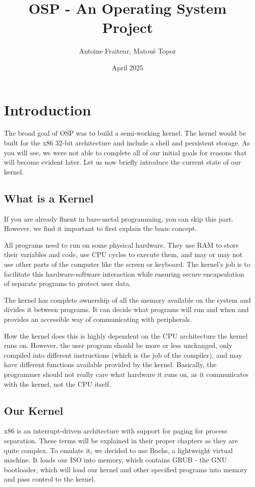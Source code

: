 \documentclass{article}
\title{OSP - An Operating System Project}
\author{Antoine Fraiteur, Matou\v{s} Topor}
\date{April 2025}
\begin{document}
\maketitle

\section{Introduction}

The broad goal of OSP was to build a semi-working kernel. The kernel would be built for the x86 32-bit architecture and include a shell and persistent storage. As you will see, we were not able to complete all of our initial goals for reasons that will become evident later. Let us now briefly introduce the current state of our kernel.

\subsection{What is a Kernel}
If you are already fluent in bare-metal programming, you can skip this part. However, we find it important to first explain the basic concept. 

All programs need to run on some physical hardware. They use RAM to store their variables and code, use CPU cycles to execute them, and may or may not use other parts of the computer like the screen or keyboard. The kernel's job is to facilitate this hardware-software interaction while ensuring secure encapsulation of separate programs to protect user data.

The kernel has complete ownership of all the memory available on the system and divides it between programs. It can decide what programs will run and when and provides an accessible way of communicating with peripherals.

How the kernel does this is highly dependent on the CPU architecture the kernel runs on. However, the user program should be more or less unchanged, only compiled into different instructions (which is the job of the compiler), and may have different functions available provided by the kernel. Basically, the programmer should not really care what hardware it runs on, as it communicates with the kernel, not the CPU itself.

\subsection{Our Kernel}
x86 is an interrupt-driven architecture with support for paging for process separation. These terms will be explained in their proper chapters as they are quite complex. To emulate it, we decided to use Bochs, a lightweight virtual machine. It loads our ISO into memory, which contains GRUB - the GNU bootloader, which will load our kernel and other specified programs into memory and pass control to the kernel.
\end{document}
